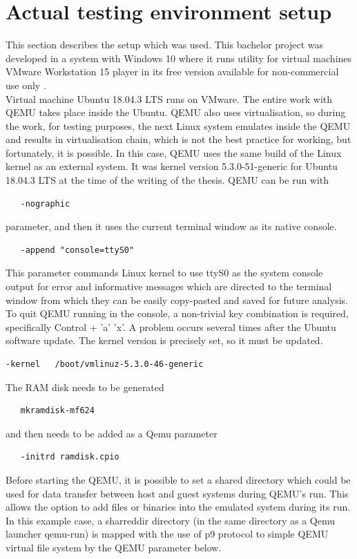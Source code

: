 \documentclass{ctuthesis}
\begin{document}
 \section{Actual testing environment setup}
  This section describes the setup which was used. This bachelor project was developed in a system with Windows 10 where it runs utility for virtual machines VMware Workstation 15 player in its free version available for non-commercial use only \cite{vmware}. \\
  Virtual machine Ubuntu 18.04.3 LTS \cite{ubuntu} runs on VMware. The entire work with QEMU takes place inside the Ubuntu. QEMU also uses virtualisation, so during the work, for testing purposes, the next Linux system emulates inside the QEMU and results in virtualisation chain, which is not the best practice for working, but fortunately, it is possible. In this case, QEMU uses the same build of the Linux kernel as an external system. It was kernel version 5.3.0-51-generic for Ubuntu 18.04.3 LTS at the time of the writing of the thesis. QEMU can be run with
  \begin{verbatim}   -nographic\end{verbatim}
   parameter, and then it uses the current terminal window as its native console.
   \begin{verbatim}   -append "console=ttyS0"\end{verbatim}
This parameter commands Linux kernel to use ttyS0 as the system console output for error and informative messages which are directed to the terminal window from which they can be easily copy-pasted and saved for future analysis. To quit QEMU running in the console, a  non-trivial key combination is required, specifically Control + 'a'  'x'. A problem occurs several times after the Ubuntu software update. The kernel version is precisely set, so it must be updated.
  \begin{verbatim}-kernel   /boot/vmlinuz-5.3.0-46-generic\end{verbatim}
  The RAM disk needs to be generated
  \begin{verbatim}   mkramdisk-mf624\end{verbatim}
  and then needs to be added as a Qemu parameter 
  \begin{verbatim}   -initrd ramdisk.cpio\end{verbatim}
  Before starting the QEMU, it is possible to set a shared directory which could be used for data transfer between host and guest systems during QEMU's run. This allows the option to add files or binaries into the emulated system during its run. In this example case, a sharreddir directory (in the same directory as a Qemu launcher qemu-run) is mapped with the use of p9 protocol to simple QEMU virtual file system by the QEMU parameter below.
\end{document}
